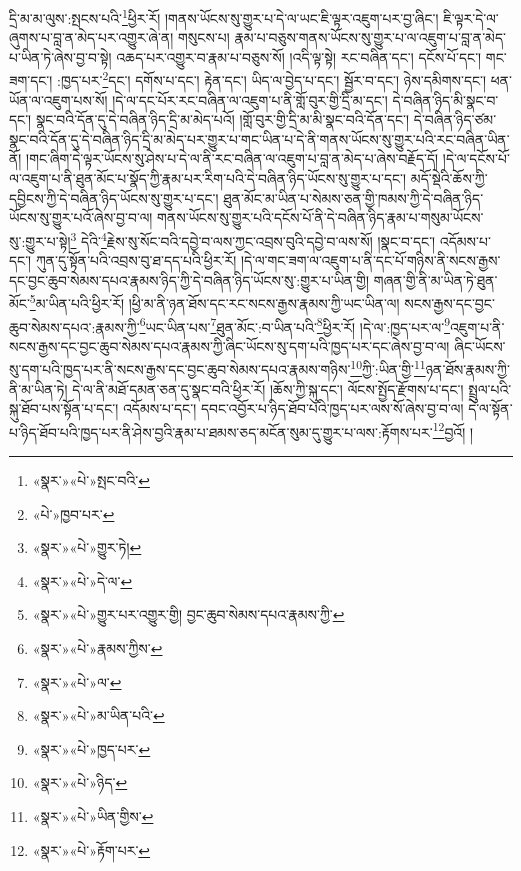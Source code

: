 དྲི་མ་མ་ལུས་:སྤངས་པའི་\footnote{«སྣར་»«པེ་»སྤང་བའི་}ཕྱིར་རོ། །གནས་ཡོངས་སུ་གྱུར་པ་དེ་ལ་ཡང་ཇི་ལྟར་འཇུག་པར་བྱ་ཞིང་། ཇི་ལྟར་དེ་ལ་ཞུགས་པ་བླ་ན་མེད་པར་འགྱུར་ཞེ་ན། གསུངས་པ། རྣམ་པ་བཅུས་གནས་ཡོངས་སུ་གྱུར་པ་ལ་འཇུག་པ་བླ་ན་མེད་པ་ཡིན་ཏེ་ཞེས་བྱ་བ་སྟེ། འཆད་པར་འགྱུར་བ་རྣམ་པ་བཅུས་སོ། །འདི་ལྟ་སྟེ། རང་བཞིན་དང་། དངོས་པོ་དང་། གང་ཟག་དང་། :ཁྱད་པར་\footnote{«པེ་»ཁྱབ་པར་}དང་། དགོས་པ་དང་། རྟེན་དང་། ཡིད་ལ་བྱེད་པ་དང་། སྦྱོར་བ་དང་། ཉེས་དམིགས་དང་། ཕན་ཡོན་ལ་འཇུག་པས་སོ། །དེ་ལ་དང་པོར་རང་བཞིན་ལ་འཇུག་པ་ནི་གློ་བུར་གྱི་དྲི་མ་དང་། དེ་བཞིན་ཉིད་མི་སྣང་བ་དང་། སྣང་བའི་དོན་དུ་དེ་བཞིན་ཉིད་དྲི་མ་མེད་པའོ། །གློ་བུར་གྱི་དྲི་མ་མི་སྣང་བའི་དོན་དང་། དེ་བཞིན་ཉིད་ཙམ་སྣང་བའི་དོན་དུ་དེ་བཞིན་ཉིད་དྲི་མ་མེད་པར་གྱུར་པ་གང་ཡིན་པ་དེ་ནི་གནས་ཡོངས་སུ་གྱུར་པའི་རང་བཞིན་ཡིན་ནོ། །གང་ཞིག་དེ་ལྟར་ཡོངས་སུ་ཤེས་པ་དེ་ལ་ནི་རང་བཞིན་ལ་འཇུག་པ་བླ་ན་མེད་པ་ཞེས་བརྗོད་དོ། །དེ་ལ་དངོས་པོ་ལ་འཇུག་པ་ནི་ཐུན་མོང་པ་སྣོད་ཀྱི་རྣམ་པར་རིག་པའི་དེ་བཞིན་ཉིད་ཡོངས་སུ་གྱུར་པ་དང་། མདོ་སྡེའི་ཆོས་ཀྱི་དབྱིངས་ཀྱི་དེ་བཞིན་ཉིད་ཡོངས་སུ་གྱུར་པ་དང་། ཐུན་མོང་མ་ཡིན་པ་སེམས་ཅན་གྱི་ཁམས་ཀྱི་དེ་བཞིན་ཉིད་ཡོངས་སུ་གྱུར་པའོ་ཞེས་བྱ་བ་ལ། གནས་ཡོངས་སུ་གྱུར་པའི་དངོས་པོ་ནི་དེ་བཞིན་ཉིད་རྣམ་པ་གསུམ་ཡོངས་སུ་:གྱུར་པ་སྟེ།\footnote{«སྣར་»«པེ་»གྱུར་ཏེ།} དེའི་\footnote{«སྣར་»«པེ་»དེ་ལ་}རྗེས་སུ་སོང་བའི་དབྱེ་བ་ལས་ཀྱང་འབྲས་བུའི་དབྱེ་བ་ལས་སོ། །སྣང་བ་དང་། འདོམས་པ་དང་། ཀུན་དུ་སྟོན་པའི་འབྲས་བུ་ཐ་དད་པའི་ཕྱིར་རོ། །དེ་ལ་གང་ཟག་ལ་འཇུག་པ་ནི་དང་པོ་གཉིས་ནི་སངས་རྒྱས་དང་བྱང་ཆུབ་སེམས་དཔའ་རྣམས་ཉིད་ཀྱི་དེ་བཞིན་ཉིད་ཡོངས་སུ་:གྱུར་པ་ཡིན་གྱི། གཞན་གྱི་ནི་མ་ཡིན་ཏེ་ཐུན་མོང་\footnote{«སྣར་»«པེ་»གྱུར་པར་འགྱུར་གྱི། བྱང་ཆུབ་སེམས་དཔའ་རྣམས་ཀྱི་}མ་ཡིན་པའི་ཕྱིར་རོ། །ཕྱི་མ་ནི་ཉན་ཐོས་དང་རང་སངས་རྒྱས་རྣམས་ཀྱི་ཡང་ཡིན་ལ། སངས་རྒྱས་དང་བྱང་ཆུབ་སེམས་དཔའ་:རྣམས་ཀྱི་\footnote{«སྣར་»«པེ་»རྣམས་ཀྱིས་}ཡང་ཡིན་པས་\footnote{«སྣར་»«པེ་»ལ་}ཐུན་མོང་:བ་ཡིན་པའི་\footnote{«སྣར་»«པེ་»མ་ཡིན་པའི་}ཕྱིར་རོ། །དེ་ལ་:ཁྱད་པར་ལ་\footnote{«སྣར་»«པེ་»ཁྱད་པར་}འཇུག་པ་ནི་སངས་རྒྱས་དང་བྱང་ཆུབ་སེམས་དཔའ་རྣམས་ཀྱི་ཞིང་ཡོངས་སུ་དག་པའི་ཁྱད་པར་དང་ཞེས་བྱ་བ་ལ། ཞིང་ཡོངས་སུ་དག་པའི་ཁྱད་པར་ནི་སངས་རྒྱས་དང་བྱང་ཆུབ་སེམས་དཔའ་རྣམས་གཉིས་\footnote{«སྣར་»«པེ་»ཉིད་}ཀྱི་:ཡིན་གྱི་\footnote{«སྣར་»«པེ་»ཡིན་གྱིས་}ཉན་ཐོས་རྣམས་ཀྱི་ནི་མ་ཡིན་ཏེ། དེ་ལ་ནི་མཐོ་དམན་ཅན་དུ་སྣང་བའི་ཕྱིར་རོ། །ཆོས་ཀྱི་སྐུ་དང་། ལོངས་སྤྱོད་རྫོགས་པ་དང་། སྤྲུལ་པའི་སྐུ་ཐོབ་པས་སྟོན་པ་དང་། འདོམས་པ་དང་། དབང་འབྱོར་པ་ཉིད་ཐོབ་པའི་ཁྱད་པར་ལས་སོ་ཞེས་བྱ་བ་ལ། དེ་ལ་སྟོན་པ་ཉིད་ཐོབ་པའི་ཁྱད་པར་ནི་ཤེས་བྱའི་རྣམ་པ་ཐམས་ཅད་མངོན་སུམ་དུ་གྱུར་པ་ལས་:རྟོགས་པར་\footnote{«སྣར་»«པེ་»རྟོག་པར་}བྱའོ། །
